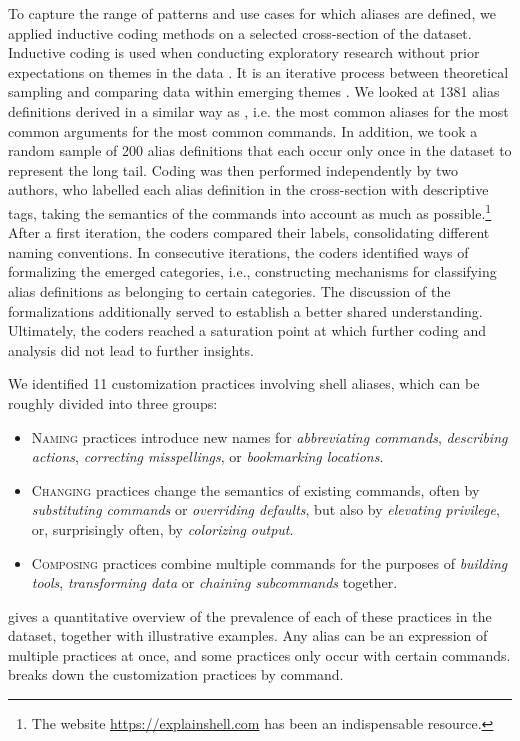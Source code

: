 To capture the range of patterns and use cases for which aliases are defined, we applied inductive coding methods on a selected cross-section of the dataset.
Inductive coding is used when conducting exploratory research without prior expectations on themes in the data \cite{thomas:06}.
It is an iterative process between theoretical sampling and comparing data within emerging themes \cite{dey:03}.
We looked at 1381 alias definitions derived in a similar way as , i.e. the most common aliases for the most common arguments for the most common commands.
In addition, we took a random sample of 200 alias definitions that each occur only once in the dataset to represent the long tail.
Coding was then performed independently by two authors, who labelled each alias definition in the cross-section with descriptive tags, taking the semantics of the commands into account as much as possible.\footnote{The website \url{https://explainshell.com} has been an indispensable resource.}
After a first iteration, the coders compared their labels, consolidating different naming conventions.
In consecutive iterations, the coders identified ways of formalizing the emerged categories, i.e., constructing mechanisms for classifying alias definitions as belonging to certain categories.
The discussion of the formalizations additionally served to establish a better shared understanding.
Ultimately, the coders reached a saturation point at which further coding and analysis did not lead to further insights.

We identified 11 customization practices involving shell aliases, which can be roughly divided into three groups:
\begin{itemize}
    \item \textsc{Naming} practices introduce new names for \emph{abbreviating commands}, \emph{describing actions}, \emph{correcting misspellings}, or \emph{bookmarking locations}.
    \item \textsc{Changing} practices change the semantics of existing commands, often by \emph{substituting commands} or \emph{overriding defaults}, but also by \emph{elevating privilege}, or, surprisingly often, by \emph{colorizing output}.    
    \item \textsc{Composing} practices combine multiple commands for the purposes of \emph{building tools}, \emph{transforming data} or \emph{chaining subcommands} together.
\end{itemize} 

 gives a quantitative overview of the prevalence of each of these practices in the dataset, together with illustrative examples.
Any alias can be an expression of multiple practices at once, and some practices only occur with certain commands.
 breaks down the customization practices by command.

